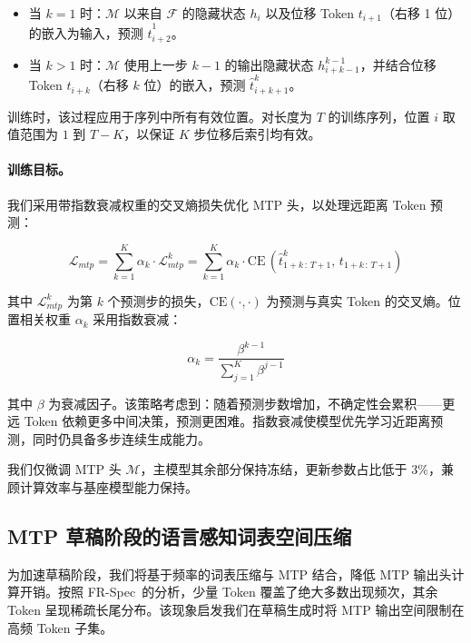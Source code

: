 \documentclass{article} %
\begin{document}
\begin{itemize}

    \item 当 $k=1$ 时：$\mathcal{M}$ 以来自 $\mathcal{F}$ 的隐藏状态 $h_i$ 以及位移 Token $t_{i+1}$（右移 1 位）的嵌入为输入，预测 $\hat{t}^1_{i+2}$。

    \item 当 $k>1$ 时：$\mathcal{M}$ 使用上一步 $k-1$ 的输出隐藏状态 $h^{k-1}_{i+k-1}$，并结合位移 Token $t_{i+k}$（右移 $k$ 位）的嵌入，预测 $\hat{t}^k_{i+k+1}$。

\end{itemize}

训练时，该过程应用于序列中所有有效位置。对长度为 $T$ 的训练序列，位置 $i$ 取值范围为 $1$ 到 $T-K$，以保证 $K$ 步位移后索引均有效。

\paragraph{训练目标。} 我们采用带指数衰减权重的交叉熵损失优化 MTP 头，以处理远距离 Token 预测：

\begin{equation}
    \mathcal{L}_{mtp} = \sum_{k=1}^{K} \alpha_k \cdot \mathcal{L}_{mtp}^k = \sum_{k=1}^{K} \alpha_k \cdot \text{CE}\,(\hat{t}^k_{1+k\,:\,T+1}, \,t_{1+k\,:\,T+1})
\end{equation}

其中 $\mathcal{L}_{mtp}^k$ 为第 $k$ 个预测步的损失，$\text{CE}(\cdot, \cdot)$ 为预测与真实 Token 的交叉熵。位置相关权重 $\alpha_k$ 采用指数衰减：

\begin{equation}
    \alpha_k = \frac{\beta^{k-1}}{\sum_{j=1}^{K} \beta^{j-1}}
\end{equation}

其中 $\beta$ 为衰减因子。该策略考虑到：随着预测步数增加，不确定性会累积——更远 Token 依赖更多中间决策，预测更困难。指数衰减使模型优先学习近距离预测，同时仍具备多步连续生成能力。

我们仅微调 MTP 头 $\mathcal{M}$，主模型其余部分保持冻结，更新参数占比低于 3\%，兼顾计算效率与基座模型能力保持。

\subsection{MTP 草稿阶段的语言感知词表空间压缩}

为加速草稿阶段，我们将基于频率的词表压缩与 MTP 结合，降低 MTP 输出头计算开销。按照 FR-Spec~\citep{zhao2025frspec}的分析，少量 Token 覆盖了绝大多数出现频次，其余 Token 呈现稀疏长尾分布。该现象启发我们在草稿生成时将 MTP 输出空间限制在高频 Token 子集。
\end{document}
